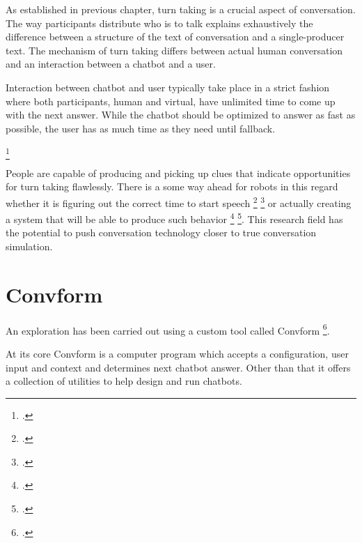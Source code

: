\documentclass[12pt]{report}
\begin{document}
{\par
As established in previous chapter, turn taking is a crucial aspect of conversation.
The way participants distribute who is to talk
explains exhaustively
the difference between
a structure of the text of conversation
and a single-producer text.
The mechanism of turn taking differs
between actual human conversation
and an interaction between a chatbot and a user.

Interaction between chatbot and user
typically take place in a strict fashion
where both participants,
human and virtual,
have unlimited time to come up with the next answer.
While the chatbot should be optimized to answer as fast as possible,
the user has as much time as they need until fallback.

\par
{} \footcite{turntaking}

\par
People are capable of producing and picking up clues
that indicate opportunities for turn taking flawlessly.
There is a some way ahead for robots in this regard
whether it is figuring out the correct time to start speech \footcite{turntakingreview} \footcite{GRAVANO2011601}
or actually creating a system that will be able to produce such behavior \footcite{distributedturntaking} \footcite{Gervits2020Sigdial}.
This research field
has the potential to push conversation technology
closer to true conversation simulation.

\section{Convform}
\par
An exploration has been carried out using a custom tool called Convform \footcite{convform}.

At its core Convform is a computer program
which accepts a configuration, user input and context
and determines next chatbot answer.
Other than that it offers a collection of utilities
to help design and run chatbots.

}
\end{document}

